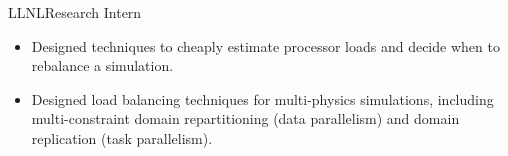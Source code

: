 		{LLNL}{Research Intern}{}{}
		{\begin{itemize}
			\item Designed techniques to cheaply estimate processor loads and decide
				when to rebalance a simulation.  
			\item Designed load balancing techniques for multi-physics simulations,
				including multi-constraint domain repartitioning (data parallelism)
				and domain replication (task parallelism).
		\end{itemize}}

